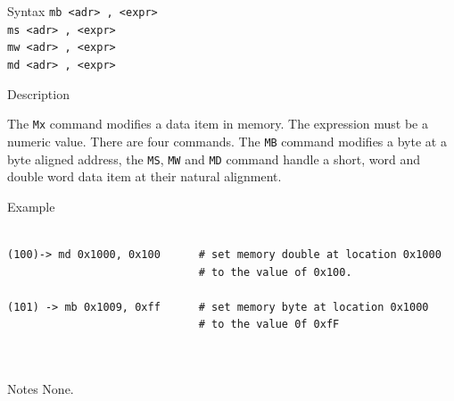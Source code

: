 %
%
\pagebreak
{}

\begin{iPageDescEntry}{Syntax}
\texttt{mb <adr> , <expr> } \\
\texttt{ms <adr> , <expr> } \\
\texttt{mw <adr> , <expr> } \\
\texttt{md <adr> , <expr> } \\
\end{iPageDescEntry}

\begin{iPageDescEntry}{Description}

The \texttt{Mx} command modifies a data item in memory. The expression must be a numeric value. There are four commands. The \texttt{MB} command modifies a byte at a byte aligned address, the \texttt{MS}, \texttt{MW} and \texttt{MD} command handle a short, word and double word data item at their natural alignment.

\end{iPageDescEntry}

\begin{iPageDescOpEntry}{Example}
\begin{lstlisting}[style=iPageOpStyle]

(100)-> md 0x1000, 0x100      # set memory double at location 0x1000 
                              # to the value of 0x100.
                              
(101) -> mb 0x1009, 0xff      # set memory byte at location 0x1000 
                              # to the value 0f 0xfF  
                              
                              

\end{lstlisting}
\end{iPageDescOpEntry}

\begin{iPageDescEntry}{Notes}
None.
\end{iPageDescEntry}
